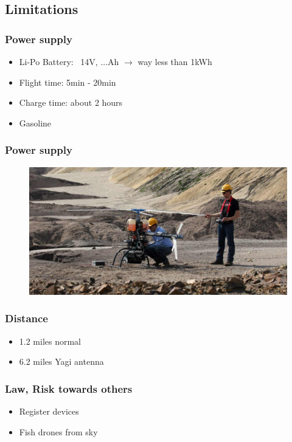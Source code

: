 \subsection{Limitations}

\begin{frame}
\frametitle{Power supply}

  \begin{itemize}
    \item Li-Po Battery: ~14V, ...Ah $\rightarrow$ way less than 1kWh
    \item Flight time: 5min - 20min
    \item Charge time: about 2 hours
	\item Gasoline
  \end{itemize}
  
\end{frame}



\begin{frame}
\frametitle{Power supply}

  \begin{figure}
  \includegraphics[scale=0.24]{pic/03_our-copter/aeroscout.jpg}
  \end{figure}
  
\end{frame}



\begin{frame}
\frametitle{Distance}

  \begin{itemize}
    \item 1.2 miles normal
    \item 6.2 miles Yagi antenna
  \end{itemize}
  
    
\end{frame}



\begin{frame}
\frametitle{Law, Risk towards others}

  \begin{itemize}
    \item Register devices    
	\item Fish drones from sky
  \end{itemize}
  	
\end{frame}










